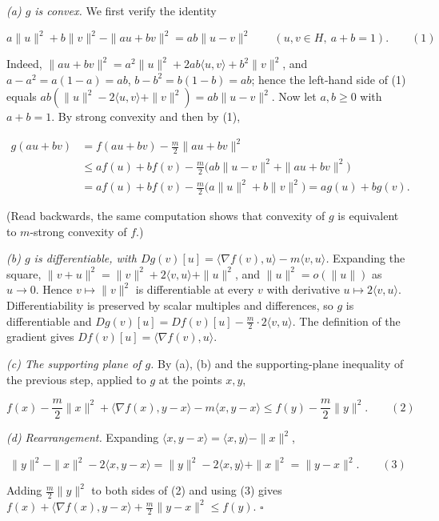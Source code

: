 \documentclass[11pt,a4paper]{article}
\begin{document}
\emph{(a) \(g\) is convex.} We first verify the identity


\[a\|u\|^2+b\|v\|^2-\|au+bv\|^2=ab\|u-v\|^2\qquad(u,v\in H,\ a+b=1).\qquad(1)\]


Indeed, \(\|au+bv\|^2=a^2\|u\|^2+2ab\langle u,v\rangle+b^2\|v\|^2\), and \(a-a^2=a(1-a)=ab\), \(b-b^2=b(1-b)=ab\); hence the left-hand side of (1) equals \(ab(\|u\|^2-2\langle u,v\rangle+\|v\|^2)=ab\|u-v\|^2\). Now let \(a,b\ge0\) with \(a+b=1\). By strong convexity and then by (1),


\[\begin{aligned}g(au+bv)&=f(au+bv)-\tfrac m2\|au+bv\|^2\\&\le af(u)+bf(v)-\tfrac m2\bigl(ab\|u-v\|^2+\|au+bv\|^2\bigr)\\&=af(u)+bf(v)-\tfrac m2\bigl(a\|u\|^2+b\|v\|^2\bigr)=ag(u)+bg(v).\end{aligned}\]


(Read backwards, the same computation shows that convexity of \(g\) is equivalent to \(m\)-strong convexity of \(f\).)




\emph{(b) \(g\) is differentiable, with \(Dg(v)[u]=\langle\nabla f(v),u\rangle-m\langle v,u\rangle\).} Expanding the square, \(\|v+u\|^2=\|v\|^2+2\langle v,u\rangle+\|u\|^2\), and \(\|u\|^2=o(\|u\|)\) as \(u\to0\). Hence \(v\mapsto\|v\|^2\) is differentiable at every \(v\) with derivative \(u\mapsto2\langle v,u\rangle\). Differentiability is preserved by scalar multiples and differences, so \(g\) is differentiable and \(Dg(v)[u]=Df(v)[u]-\frac m2\cdot2\langle v,u\rangle\). The definition of the gradient gives \(Df(v)[u]=\langle\nabla f(v),u\rangle\).




\emph{(c) The supporting plane of \(g\).} By (a), (b) and the supporting-plane inequality of the previous step, applied to \(g\) at the points \(x,y\),


\[f(x)-\frac m2\|x\|^2+\langle\nabla f(x),y-x\rangle-m\langle x,y-x\rangle\le f(y)-\frac m2\|y\|^2.\qquad(2)\]


\emph{(d) Rearrangement.} Expanding \(\langle x,y-x\rangle=\langle x,y\rangle-\|x\|^2\),


\[\|y\|^2-\|x\|^2-2\langle x,y-x\rangle=\|y\|^2-2\langle x,y\rangle+\|x\|^2=\|y-x\|^2.\qquad(3)\]


Adding \(\frac m2\|y\|^2\) to both sides of (2) and using (3) gives \(f(x)+\langle\nabla f(x),y-x\rangle+\frac m2\|y-x\|^2\le f(y)\). \(\square\)
\end{document}
